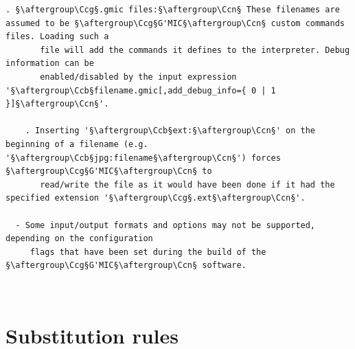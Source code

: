 \documentclass[a4paper,10.5pt,twoside]{book}
\def\Ccb{\color{cb}}
\def\Ccg{\color{cc}}
\def\Ccn{\color{black}}
\begin{document}
\begin{lstlisting}[escapechar=§]
    . §\aftergroup\Ccg§.gmic files:§\aftergroup\Ccn§ These filenames are assumed to be §\aftergroup\Ccg§G'MIC§\aftergroup\Ccn§ custom commands files. Loading such a 
       file will add the commands it defines to the interpreter. Debug information can be 
       enabled/disabled by the input expression '§\aftergroup\Ccb§filename.gmic[,add_debug_info={ 0 | 1 }]§\aftergroup\Ccn§'. 
 
    . Inserting '§\aftergroup\Ccb§ext:§\aftergroup\Ccn§' on the beginning of a filename (e.g. '§\aftergroup\Ccb§jpg:filename§\aftergroup\Ccn§') forces §\aftergroup\Ccg§G'MIC§\aftergroup\Ccn§ to 
       read/write the file as it would have been done if it had the specified extension '§\aftergroup\Ccg§.ext§\aftergroup\Ccn§'. 
 
  - Some input/output formats and options may not be supported, depending on the configuration 
     flags that have been set during the build of the §\aftergroup\Ccg§G'MIC§\aftergroup\Ccn§ software.
\end{lstlisting}
\normalsize
~\\\section{Substitution rules}
\small
\end{document}
